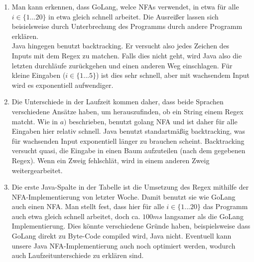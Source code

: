 \documentclass[11pt]{article}
\begin{document}
\begin{enumerate}[label=\alph*)]
\item Man kann erkennen, dass GoLang, welce NFAs verwendet, in etwa für alle $i \in \{1...20\}$ in etwa gleich schnell arbeitet. Die Ausreißer lassen sich beisielsweise durch Unterbrechung des Programms durch andere Programm erklären.\\
Java hingegen benutzt backtracking. Er versucht also jedes Zeichen des Inputs mit dem Regex zu matchen. Falls dies nicht geht, wird Java also die letzten durchläufe zurückgehen und einen anderen Weg einschlagen. Für kleine Eingaben ($i \in \{1...5\}$) ist dies sehr schnell, aber mit wachsendem Input wird es exponentiell aufwendiger.

\item Die Unterschiede in der Laufzeit kommen daher, dass beide Sprachen verschiedene Ansätze haben, um herauszufinden, ob ein String einem Regex matcht. Wie in $a)$ beschrieben, benutzt golang NFA und ist daher für alle Eingaben hier relativ schnell. Java benutzt standartmäßig backtracking, was für wachsenden Input exponentiell länger zu brauchen scheint. Backtracking versucht quasi, die Eingabe in einen Baum aufzuteilen (nach dem gegebenen Regex). Wenn ein Zweig fehlschlät, wird in einem anderen Zweig weitergearbeitet.

\item Die erste Java-Spalte in der Tabelle ist die Umsetzung des Regex mithilfe der NFA-Implementierung von letzter Woche. Damit benutzt sie wie GoLang auch einen NFA. Man stellt fest, dass hier für alle $i \in \{1...20\}$ das Programm auch etwa gleich schnell arbeitet, doch ca. $100 ms$ langsamer als die GoLang Implementierung. Dies könnte verschiedene Gründe haben, beispielsweise dass GoLang direkt zu Byte-Code compiled wird, Java nicht. Eventuell kann unsere Java NFA-Implementierung auch noch optimiert werden, wodurch auch Laufzeitunterschiede zu erklären sind.
\end{enumerate}
\end{document}
